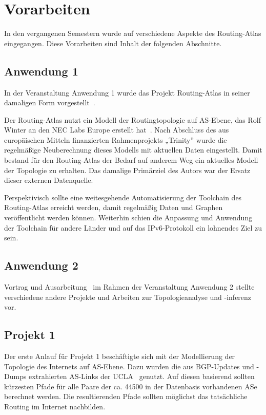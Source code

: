 \section{Vorarbeiten}\label{sec:previous}

In den vergangenen Semestern wurde auf verschiedene Aspekte des Routing-Atlas eingegangen.
Diese Vorarbeiten sind Inhalt der folgenden Abschnitte.

\subsection{Anwendung 1}
In der Veranstaltung Anwendung 1 wurde das Projekt Routing-Atlas in seiner damaligen Form vorgestellt~\cite{KrohnAW1}.

Der Routing-Atlas nutzt ein Modell der Routingtopologie auf AS-Ebene, das Rolf Winter an den NEC Labs Europe erstellt hat~\cite{neclab-topology, Winter:2009:MIR:1577959.1577976}.
Nach Abschluss des aus europäischen Mitteln finanzierten Rahmenprojekts „Trinity” wurde die regelmäßige Neuberechnung dieses Modells mit aktuellen Daten eingestellt.
Damit bestand für den Routing-Atlas der Bedarf auf anderem Weg ein aktuelles Modell der Topologie zu erhalten.
Das damalige Primärziel des Autors war der Ersatz dieser externen Datenquelle.

Perspektivisch sollte eine weitesgehende Automatisierung der Toolchain des Routing-Atlas erreicht werden, damit regelmäßig Daten und Graphen veröffentlicht werden können.
Weiterhin schien die Anpassung und Anwendung der Toolchain für andere Länder und auf das IPv6-Protokoll ein lohnendes Ziel zu sein.

\subsection{Anwendung 2}
Vortrag und Ausarbeitung~\cite{KrohnAW2} im Rahmen der Veranstaltung Anwendung 2 stellte verschiedene andere Projekte und Arbeiten zur Topologieanalyse und -inferenz vor.



\subsection{Projekt 1}
Der erste Anlauf für Projekt 1 beschäftigte sich mit der Modellierung der Topologie des Internets auf AS-Ebene.
Dazu wurden die aus BGP-Updates und -Dumps extrahierten AS-Links der UCLA~\cite{ucla-topology, Zhang:2005:CIA:1052812.1052825} genutzt.
Auf diesen basierend sollten kürzesten Pfade für alle Paare der ca. 44500 in der Datenbasis vorhandenen ASe berechnet werden. %
Die resultierenden Pfade sollten möglichst das tatsächliche Routing im Internet nachbilden.

